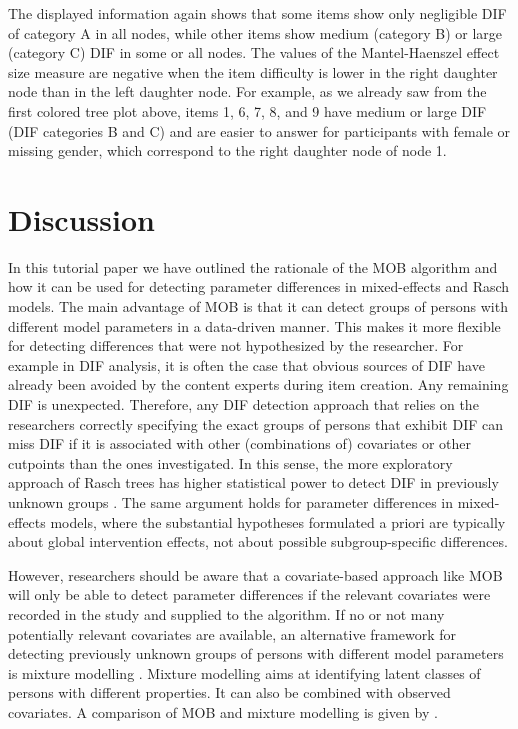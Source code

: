 \documentclass[doc,floatsintext,natbib]{apa7}
\begin{document}
The displayed information again shows that some items show only negligible DIF of category A in all nodes, while other items show medium (category B) or large (category C) DIF in some or all nodes. The values of the Mantel-Haenszel effect size measure are negative when the item difficulty is lower in the right daughter node than in the left daughter node. For example, as we already saw from the first colored tree plot above, items 1, 6, 7, 8, and 9 have medium or large DIF (DIF categories B and C) and are  easier to answer %
for participants with female or missing gender, which correspond to the right daughter node of node 1. %


\FloatBarrier
\section{Discussion}

In this tutorial paper we have outlined the rationale of the MOB algorithm and how it can be used for detecting parameter differences in mixed-effects and Rasch models. The main advantage of MOB is that it can detect groups of persons with different model parameters in a data-driven manner. This makes it more flexible for detecting differences that were not hypothesized by the researcher. For example in DIF analysis, it is often the case that obvious sources of DIF have already been avoided by the content experts during item creation. Any remaining DIF is unexpected. Therefore, any DIF detection approach that relies on the researchers correctly specifying the exact groups of persons that exhibit DIF can miss DIF if it is associated with other (combinations of) covariates or other cutpoints than the ones investigated. In this sense, the more exploratory approach of Rasch trees has higher statistical power to detect DIF in previously unknown groups \citep{StrKopZei:2015:P}. The same argument holds for parameter differences in mixed-effects models, where the substantial hypotheses formulated a priori are typically about global intervention effects, not about possible subgroup-specific differences. 


However, researchers should be aware that a covariate-based approach like MOB will only be able to detect parameter differences if the relevant covariates were recorded in the study and supplied to the algorithm. If no or not many potentially relevant covariates are available, an alternative framework for detecting previously unknown groups of persons with different model parameters is mixture modelling \citep[see, e.g.,][in the context of Rasch modelling]{AyalySant17,FriStrZei:2015:EaPM}. Mixture modelling aims at identifying latent classes of persons with different properties. It can also be combined with observed covariates. A comparison of MOB and mixture modelling is given by \citet{FriStrZei:2014}.
\end{document}
